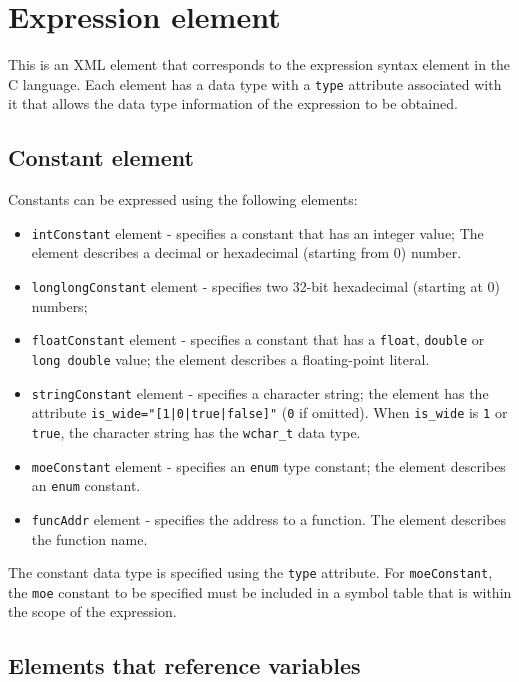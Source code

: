 \section{Expression element}

This is an XML element that corresponds to the expression syntax element in the C language. Each element has a data type with a {\tt type} attribute associated with it that allows the data type information of the expression to be obtained.

\subsection{Constant element}

Constants can be expressed using the following elements:

\begin{itemize}
\item {\tt intConstant} element - specifies a constant that has an integer value;
The element describes a decimal or hexadecimal (starting from 0) number.
\item {\tt longlongConstant} element - specifies two 32-bit hexadecimal (starting at 0) numbers;
\item {\tt floatConstant} element - specifies a constant that has a {\tt float}, {\tt double} or {\tt long double} value; 
the element describes a floating-point literal.
\item {\tt stringConstant} element - specifies a character string;
the element has the attribute {\tt is\_wide="[1|0|true|false]"} ({\tt 0} if omitted). When {\tt is\_wide} is {\tt 1} or {\tt true}, the character string has the {\tt wchar\_t} data type.
\item {\tt moeConstant} element - specifies an {\tt enum} type constant;
the element describes an {\tt enum} constant.
\item {\tt funcAddr} element - specifies the address to a function.
The element describes the function name.
\end{itemize}

The constant data type is specified using the {\tt type} attribute.
For {\tt moeConstant}, the {\tt moe} constant to be specified must be included in a symbol table that is within the scope of the expression.

\subsection{Elements that reference variables}

